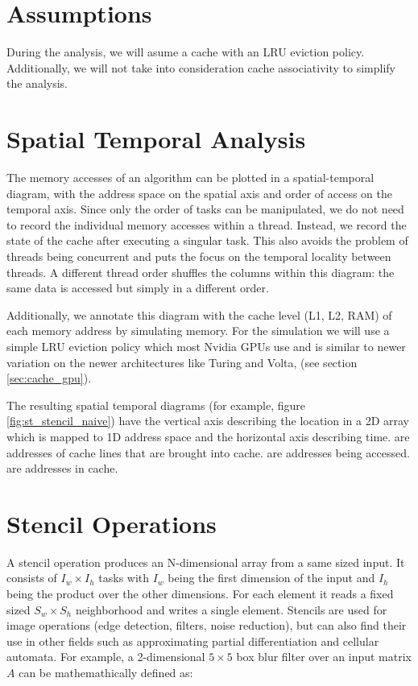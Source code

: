 \section{Assumptions}
During the analysis, we will asume a cache with an LRU eviction policy.
Additionally, we will not take into consideration cache associativity to simplify the analysis.

\section{Spatial Temporal Analysis}
\label{sec:st_analysis}
The memory accesses of an algorithm can be plotted in a spatial-temporal diagram, with the address space on the spatial axis and order of access on the temporal axis.
Since only the order of tasks can be manipulated, we do not need to record the individual memory accesses within a thread.
Instead, we record the state of the cache after executing a singular task.
This also avoids the problem of threads being concurrent and puts the focus on the temporal locality between threads.
A different thread order shuffles the columns within this diagram: the same data is accessed but simply in a different order.

Additionally, we annotate this diagram with the cache level (L1, L2, RAM) of each memory address by simulating memory.
For the simulation we will use a simple LRU eviction policy which most Nvidia GPUs use and is similar to newer variation on the newer architectures like Turing and Volta, (see section \ref{sec:cache_gpu}).

The resulting spatial temporal diagrams (for example, figure \ref{fig:st_stencil_naive}) have the vertical axis describing the location in a 2D array which is mapped to 1D address space and the horizontal axis describing time.  are addresses of cache lines that are brought into cache.  are addresses being accessed.  are addresses in cache.

\section{Stencil Operations}

A stencil operation produces an N-dimensional array from a same sized input.
It consists of $I_w \times I_h$ tasks with $I_w$ being the first dimension of the input and $I_h$ being the product over the other dimensions.
For each element it reads a fixed sized $S_w \times S_h$ neighborhood and writes a single element.
Stencils are used for image operations (edge detection, filters, noise reduction), but can also find their use in other fields such as approximating partial differentiation\cite{roth1997compilingstencils} and cellular automata.
For example, a 2-dimensional $5 \times 5$ box blur filter over an input matrix $A$ can be mathemathically defined as:


